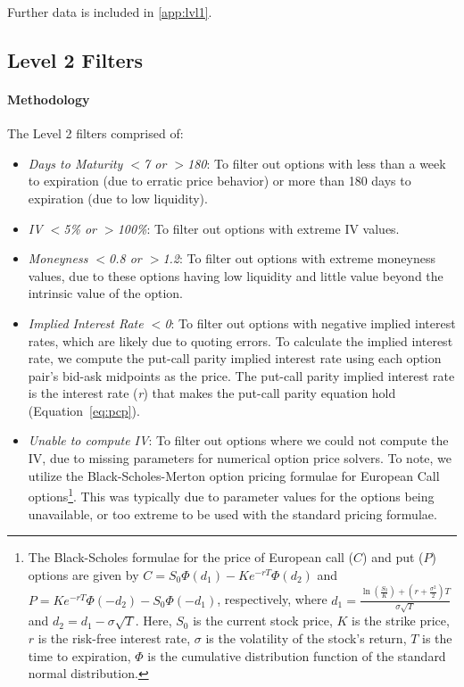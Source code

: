 Further data is included in \autoref{app:lvl1}. 


\subsection {Level 2 Filters}

\paragraph{Methodology}

The Level 2 filters comprised of: 
\begin{itemize}
  \item \textit{Days to Maturity $<$7 or $>$180}: To filter out options with less than a week to expiration (due to erratic price behavior) or more than 180 days to expiration (due to low liquidity).
  \item \textit{IV $<$5\% or $>$100\%}: To filter out options with extreme IV values.
  \item \textit{Moneyness $<$0.8 or $>$1.2}: To filter out options with extreme moneyness values, due to these options having low liquidity and little value beyond the intrinsic value of the option.
  \item \textit{Implied Interest Rate $<$0}: To filter out options with negative implied interest rates, which are likely due to quoting errors. To calculate the implied interest rate, we compute the put-call parity implied interest rate using each option pair's bid-ask midpoints as the price. The put-call parity implied interest rate is the interest rate (\textit{r}) that makes the put-call parity equation hold (Equation~\ref{eq:pcp}).
  \item \textit{Unable to compute IV}: To filter out options where we could not compute the IV, due to missing parameters for numerical option price solvers. To note, we utilize the Black-Scholes-Merton option pricing formulae for European Call options\footnote{The Black-Scholes formulae for the price of European call ($C$) and put ($P$) options are given by $C = S_0 \Phi(d_1) - K e^{-rT} \Phi(d_2)$ and $P = K e^{-rT} \Phi(-d_2) - S_0 \Phi(-d_1)$, respectively, where $d_1 = \frac{\ln(\frac{S_0}{K}) + (r + \frac{\sigma^2}{2})T}{\sigma\sqrt{T}}$ and $d_2 = d_1 - \sigma\sqrt{T}$. Here, $S_0$ is the current stock price, $K$ is the strike price, $r$ is the risk-free interest rate, $\sigma$ is the volatility of the stock's return, $T$ is the time to expiration, $\Phi$ is the cumulative distribution function of the standard normal distribution.
  }. This was typically due to parameter values for the options being unavailable, or too extreme to be used with the standard pricing formulae.
\end{itemize}


